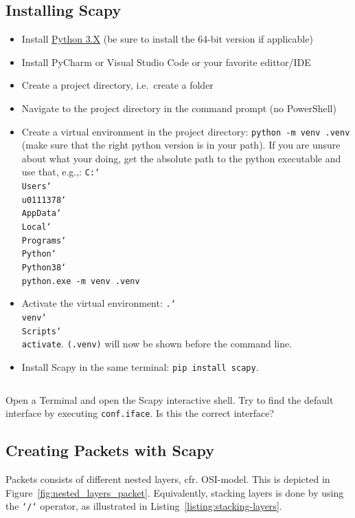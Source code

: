 \documentclass[11pt,a4paper]{article}
\begin{document}
\subsection{Installing Scapy}
\begin{itemize}
    \item Install \href{https://www.python.org/downloads}{Python 3.X} (be sure to install the 64-bit version if applicable)
    \item Install PyCharm or Visual Studio Code or your favorite edittor/IDE
    \item Create a project directory, i.e.\ create a folder
    \item Navigate to the project directory in the command prompt (no PowerShell)
    \item Create a virtual environment in the project directory: \texttt{python -m venv .venv} (make sure that the right python version is in your path). If you are unsure about what your doing, get the absolute path to the python executable and use that, e.g.,:
    \texttt{C:\char`\\Users\char`\\u0111378\char`\\AppData\char`\\Local\char`\\Programs\char`\\Python\char`\\Python38\char`\\python.exe -m venv .venv}
    \item Activate the virtual environment:
    \texttt{.\char`\\venv\char`\\Scripts\char`\\activate}. \texttt{(.venv)} will now be shown before the command line.
    \item Install Scapy in the same terminal: \texttt{pip install scapy}.
\end{itemize}

\begin{listing}[h]
\inputminted{batch}{../code_students/create_scapy_project.cmd}
\end{listing}


\begin{question}
    Open a Terminal and open the Scapy interactive shell. Try to find the default interface by executing \texttt{conf.iface}. Is this the correct interface? 
\end{question}

\subsection{Creating Packets with Scapy}
Packets consists of different nested layers, cfr. OSI-model. This is depicted in Figure~\ref{fig:nested_layers_packet}. Equivalently, stacking layers is done by using the \texttt{`/`} operator, as illustrated in Listing~\ref{listing:stacking-layers}.
\end{document}
